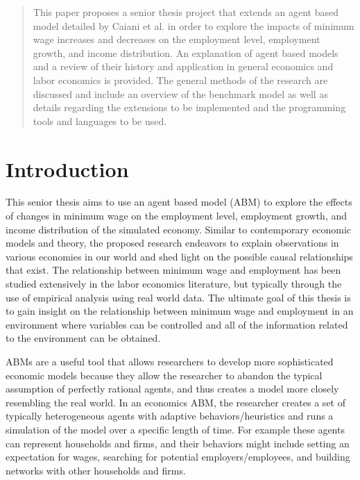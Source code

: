 \documentclass[11pt]{article}
\begin{document}
\begin{quote}

  This paper proposes a senior thesis project that extends an agent based model
  detailed by Caiani et al. in order to explore the impacts of minimum wage increases
  and decreases on the employment level, employment growth, and income distribution.
  An explanation of agent based models and a review of their history and application
  in general economics and labor economics is provided. The general methods of the
  research are discussed and include an overview of the benchmark model as well
  as details regarding the extensions to be implemented and the programming tools and
  languages to be used.
\end{quote}

\section{Introduction}
\label{sec:introduction}


This senior thesis aims to use an agent based model (ABM) to explore the effects
of changes in minimum wage on the employment level, employment growth, and income
distribution of the simulated economy.  Similar to contemporary economic models
and theory, the proposed research endeavors to explain observations in various
economies in our world and shed light on the possible causal relationships that
exist. The relationship between minimum wage and employment has been studied
extensively in the labor economics literature, but typically through the use
of empirical analysis using real world data. The ultimate goal of this thesis
is to gain insight on the relationship between minimum wage and employment in
an environment where variables can be controlled and all of the information
related to the environment can be obtained.

ABMs are a useful tool that allows researchers to develop more sophisticated
economic models because they allow the researcher to abandon the typical assumption
of perfectly rational agents, and thus creates a model more closely resembling
the real world. In an economics ABM,  the researcher creates a set of typically
 heterogeneous agents with adaptive behaviors/heuristics and runs a simulation
 of the model over a specific length of time. For example these agents can
 represent households and firms, and their behaviors might include setting an
 expectation for wages, searching for potential employers/employees, and building
 networks with other households and firms.
\end{document}
